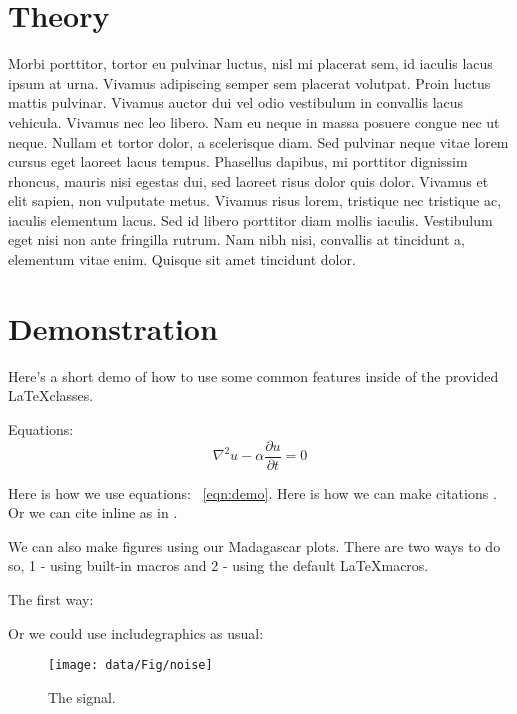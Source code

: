 \section{Theory}
Morbi porttitor, tortor eu pulvinar luctus, nisl mi placerat sem, id iaculis lacus ipsum at urna. Vivamus adipiscing semper sem placerat volutpat. Proin luctus mattis pulvinar. Vivamus auctor dui vel odio vestibulum in convallis lacus vehicula. Vivamus nec leo libero. Nam eu neque in massa posuere congue nec ut neque. Nullam et tortor dolor, a scelerisque diam. Sed pulvinar neque vitae lorem cursus eget laoreet lacus tempus. Phasellus dapibus, mi porttitor dignissim rhoncus, mauris nisi egestas dui, sed laoreet risus dolor quis dolor. Vivamus et elit sapien, non vulputate metus. Vivamus risus lorem, tristique nec tristique ac, iaculis elementum lacus. Sed id libero porttitor diam mollis iaculis. Vestibulum eget nisi non ante fringilla rutrum. Nam nibh nisi, convallis at tincidunt a, elementum vitae enim. Quisque sit amet tincidunt dolor.

\section{Demonstration}
Here's a short demo of how to use some common features inside of the provided \LaTeX classes.

Equations:
\begin{equation}
    \nabla^2 u - \alpha \frac{\partial u}{\partial t} = 0
\label{eqn:demo}
\end{equation}

Here is how we use equations: ~\ref{eqn:demo}.  Here is how we can make citations \cite[]{godwin_blended_2010,krebs_fast_2009,duquet_3d_1999}. Or we can cite inline as in \cite{godwin_blended_2010}.

We can also make figures using our Madagascar plots.  There are two ways to do so, 1 - using built-in macros and 2 - using the default \LaTeX macros.

The first way:



Or we could use includegraphics as usual:

\begin{figure}
    \texttt{[image: data/Fig/noise]} 
    \caption{The signal.}
\label{Fig:noise}
\end{figure}

